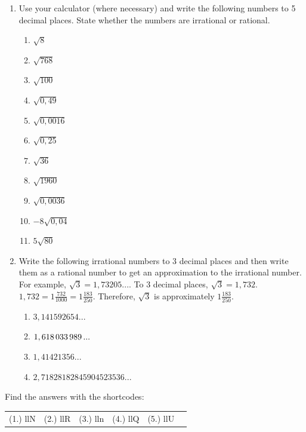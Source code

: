 \begin{enumerate}[noitemsep, label=\textbf{\arabic*}. ]
        \label{m38349*uid32}\item Use your calculator (where necessary) and write the following numbers to 5 decimal places. State whether the numbers are irrational or rational.
\label{m38349*id326080}\begin{enumerate}[noitemsep, label=\textbf{\alph*}. ] 
            \label{m38349*uid33}\item $\sqrt{8}$\label{m38349*uid34}\item $\sqrt{768}$\label{m38349*uid35}\item $\sqrt{100}$\label{m38349*uid36}\item $\sqrt{0,49}$\label{m38349*uid37}\item $\sqrt{0,0016}$\label{m38349*uid38}\item $\sqrt{0,25}$\label{m38349*uid39}\item $\sqrt{36}$\label{m38349*uid40}\item $\sqrt{1960}$\label{m38349*uid41}\item $\sqrt{0,0036}$\label{m38349*uid42}\item $-8\sqrt{0,04}$\label{m38349*uid43}\item $5\sqrt{80}$\end{enumerate}
        \label{m38349*uid44}\item Write the following irrational numbers to 3 decimal places and then write them as a rational number to get an approximation to the irrational number. For example, $\sqrt{3}=1,73205...$. To 3 decimal places, $\sqrt{3}=1,732$. $1,732=1\frac{732}{1000}=1\frac{183}{250}$. Therefore, $\sqrt{3}$ is approximately $1\frac{183}{250}$.
\label{m38349*id326443}\begin{enumerate}[noitemsep, label=\textbf{\alph*}. ] 
            \label{m38349*uid45}\item $3,141592654...$\label{m38349*uid46}\item $1,618\phantom{\rule{0.166667em}{0ex}}033\phantom{\rule{0.166667em}{0ex}}989\phantom{\rule{0.166667em}{0ex}}...$\label{m38349*uid47}\item $1,41421356...$\label{m38349*uid48}\item $2,71828182845904523536...$\end{enumerate}
        \end{enumerate}
  \label{m38349**end}
\par {} Find the answers with the shortcodes:
 \par \begin{tabular}[h]{cccccc}
 (1.) llN  &  (2.) llR  &  (3.) lln  &  (4.) llQ  &  (5.) llU  & \end{tabular}
